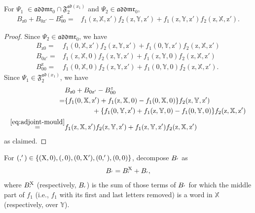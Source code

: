 \documentclass[15pt,oneside,reqno]{amsart}
\theoremstyle{remark}{
\newtheorem{lem}[df]{Lemma}
\newtheorem{prop}[df]{Proposition}
\newtheorem{ex}[df]{Example}
\newtheorem{rmk}[df]{Remark}
}
\newcommand{\addmr}{\mathfrak{addmr}}
\newcommand{\ad}{\mathfrak{ad}}
\newcommand{\Fad}{\mathfrak{F}_2^{\ad(x_1)}}
\newcommand{\z}{\mathrm{z}}
\let\Y\relax
\newcommand{\X}{\mathrm{X}}
\let\Y\relax
\newcommand{\Y}{\mathrm{Y}}
\let\V\relax
\newcommand{\V}{\mathrm{V}}
\begin{document}
\begin{lem}\label{eq:Conv-harmonic-z}
For $\Psi_1$ $\in \addmr_0 \cap \Fad $ and $\Psi_2\in \addmr_0$,
\begin{align*}
B_{\z0} + B_{0\z'} - B_{00}^{\z}=&f_1(\z,\mathbb{X},\z')f_2(\z,\mathbb{Y},\z') +  f_1(\z,\mathbb{Y},\z')f_2(\z,\mathbb{X},\z').
\end{align*}
\end{lem}

\begin{proof}
Since $\Psi_2 \in \addmr_0$, we have
\begin{align*}
B_{\z0} =& f_1(0,\mathbb{X},\z')f_2(\z,\mathbb{Y},\z') +  f_1(0,\mathbb{Y},\z')f_2(\z,\mathbb{X},\z')\\ 
B_{0\z'} =& f_1(\z,\mathbb{X},0)f_2(\z,\mathbb{Y},\z') +  f_1(\z,\mathbb{Y},0)f_2(\z,\mathbb{X},\z')\\ 
B_{00}^{\z} =& f_1(0,\mathbb{X},0)f_2(\z,\mathbb{Y},\z') +  f_1(0,\mathbb{Y},0)f_2(\z,\mathbb{X},\z').
\end{align*}
Since $\Psi_1 \in \Fad$, we have
\begin{align*}
&B_{\z0} + B_{0\z'} - B_{00}^z \\
=&\{ f_1(0,\mathbb{X},\z') + f_1(\z,\mathbb{X},0) - f_1(0,\mathbb{X},0) \}f_2(\z,\mathbb{Y},\z') \\
&\qquad \qquad+ \{ f_1(0,\mathbb{Y},\z') + f_1(\z,\mathbb{Y},0) - f_1(0,\mathbb{Y},0) \}f_2(\z,\mathbb{X},\z')\\
\stackrel{\eqref{eq:adjoint-mould}}{=} &f_1(\z,\mathbb{X},\z')f_2(\z,\mathbb{Y},\z') +  f_1(\z,\mathbb{Y},\z')f_2(\z,\mathbb{X},\z')
\end{align*}
as claimed.
\end{proof}

For $(\V,\V') \in \{(\X,0),(\Y,0),(0,\X'),(0,\Y'),(0,0)\}$, decompose $B_{\V\V'}$ as
\[
B_{\V\V'} = B_{\V\V'}^{\X} + B_{\V\V'}^{\Y},
\]
where $B_{\V\V'}^{\X}$ (respectively, $B_{\V\V'}^{\Y}$) is the sum of those terms of $B_{\V\V'}$ for which the middle part of $f_{1}$ (i.e., $f_{1}$ with its first and last letters removed) is a word in $\mathbb{X}$ (respectively, over $\mathbb{Y}$).
\end{document}

